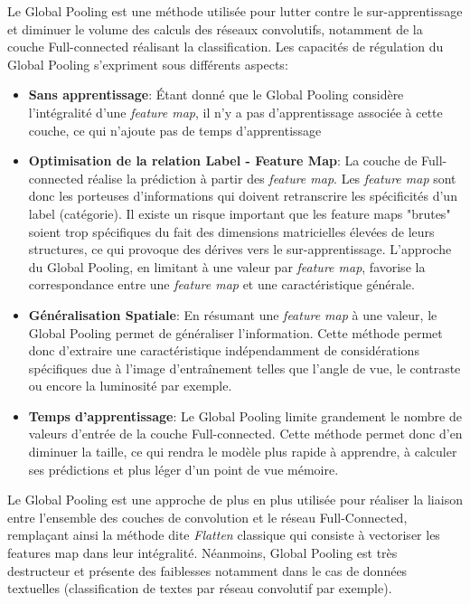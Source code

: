 \noindent Le Global Pooling est une méthode utilisée pour lutter contre le sur-apprentissage et  diminuer le volume des calculs des réseaux convolutifs, notamment de la couche Full-connected réalisant la classification. Les capacités de régulation du Global Pooling s'expriment sous différents aspects:

\begin{itemize}
    \item \textbf{Sans apprentissage}: Étant donné que le Global Pooling considère l'intégralité d'une \textit{feature map}, il n'y a pas d'apprentissage associée à cette couche, ce qui n'ajoute pas de temps d'apprentissage

    \item \textbf{Optimisation de la relation Label - Feature Map}: La couche de Full-connected réalise la prédiction à partir des \textit{feature map}. Les \textit{feature map} sont donc les porteuses d'informations qui doivent retranscrire les spécificités d'un label (catégorie). Il existe un risque important que les feature maps "brutes" soient trop spécifiques du fait des dimensions matricielles élevées de leurs structures, ce qui provoque des dérives vers le sur-apprentissage. L'approche du Global Pooling, en limitant à une valeur par \textit{feature map}, favorise la correspondance entre une \textit{feature map} et une caractéristique générale.

    \item \textbf{Généralisation Spatiale}: En résumant une \textit{feature map} à une valeur, le Global Pooling permet de généraliser l'information. Cette méthode permet donc d'extraire une caractéristique indépendamment de considérations spécifiques due à l'image d'entraînement telles que l'angle de vue, le contraste ou encore la luminosité par exemple.

    \item \textbf{Temps d'apprentissage}: Le Global Pooling limite grandement le nombre de valeurs d'entrée de la couche Full-connected. Cette méthode permet donc d'en diminuer la taille, ce qui rendra le modèle plus rapide à apprendre, à calculer ses prédictions et plus léger d'un point de vue mémoire.
\end{itemize}

\noindent Le Global Pooling est une approche de plus en plus utilisée pour réaliser la liaison entre l'ensemble des couches de convolution et le réseau Full-Connected, remplaçant ainsi la méthode dite \textit{Flatten} classique qui consiste à vectoriser les features map dans leur intégralité. Néanmoins, Global Pooling est très destructeur et présente des faiblesses notamment dans le cas de données textuelles (classification de textes par réseau convolutif par exemple).

